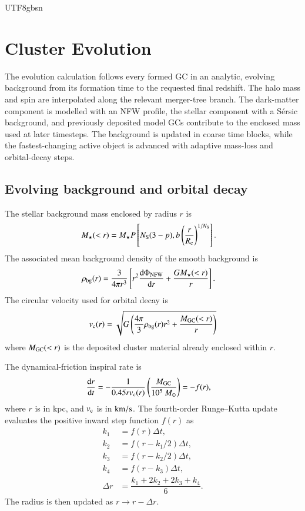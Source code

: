 \documentclass[trackchanges, twocolappendix, twocolumn]{aastex701}
\begin{document}
\begin{CJK*}{UTF8}{gbsn}
\section{Cluster Evolution}
\label{app:evolution_equations}
\label{subsect:gc_evolution}

The evolution calculation follows every formed GC in an analytic, evolving background from its formation time to the requested final redshift. The halo mass and spin are interpolated along the relevant merger-tree branch. The dark-matter component is modelled with an NFW profile, the stellar component with a S{\'e}rsic background, and previously deposited model GCs contribute to the enclosed mass used at later timesteps. The background is updated in coarse time blocks, while the fastest-changing active object is advanced with adaptive mass-loss and orbital-decay steps.

\subsection{Evolving background and orbital decay}

The stellar background mass enclosed by radius $r$ is
\begin{align}
M_{\star}(<r) & = M_{\star} P \left[ N_{\rm S} (3 - p), b \left( \dfrac{r}{R_{\rm e}} \right)^{1 / N_{\rm S}} \right].
\end{align}
The associated mean background density of the smooth background is
\begin{align}
\rho_{\rm bg} (r) &=
\dfrac{3}{4 \pi r^3} \left[ r^2 \dfrac{\mathrm{d} \Phi_{\rm NFW}}{\mathrm{d} r} + \dfrac{G M_\star (< r)}{r} \right] .
\end{align}
The circular velocity used for orbital decay is
\begin{align}
v_{\rm c} (r) = \sqrt{G \left( \dfrac{4 \pi}{3} \rho_{\rm bg} (r) r^2 + \dfrac{M_{\rm GC} (< r)}{r} \right)}
\end{align}
where $M_{\rm GC} (< r)$ is the deposited cluster material already enclosed within $r$.

The dynamical-friction inspiral rate is
\begin{align}
\dfrac{\mathrm{d} r}{\mathrm{d} t} & = - \dfrac{1}{0.45 r v_{\rm c} (r)} \left( \dfrac{M_{\rm GC}}{10^5~M_\odot} \right) = - f (r),
\label{eq:DF}
\end{align}
where $r$ is in kpc, and $v_{\rm c}$ is in $\rm km/s$. The fourth-order Runge--Kutta update evaluates the positive inward step function $f (r)$ as
\begin{align}
k_1 & = f (r) \Delta t , \\
k_2 & = f (r - k_1 / 2) \Delta t , \\
k_3 & = f (r - k_2 / 2) \Delta t , \\
k_4 & = f (r - k_3) \Delta t , \\
\Delta r &= \dfrac{k_1+2k_2+2k_3+k_4}{6}.
\end{align}
The radius is then updated as $r\rightarrow r-\Delta r$.


\end{CJK*}
\end{document}
